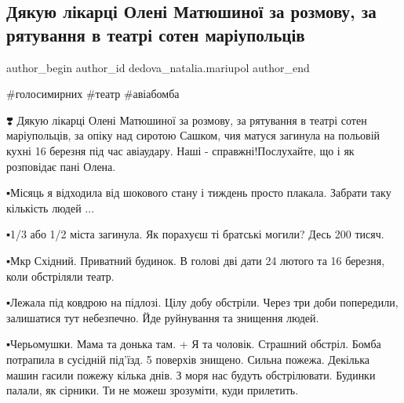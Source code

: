  
 
 
 
 

\subsection{Дякую лікарці Олені Матюшиної за розмову, за рятування в театрі сотен маріупольців}
\label{sec:09_01_2023.fb.dedova_natalia.mariupol.1.dyakuyu_l_karts__ole}

\ifcmt
 author_begin
   author_id dedova_natalia.mariupol
 author_end
\fi

\#голосимирних
\#театр
\#авіабомба

❣️ Дякую лікарці Олені Матюшиної за розмову, за рятування в театрі сотен
маріупольців, за опіку над сиротою Сашком, чия матуся загинула на польовій
кухні 16 березня під час авіаудару. Наші - справжні!Послухайте, що і як
розповідає пані Олена. 

▪️Місяць я відходила від шокового стану і тиждень просто плакала. Забрати таку
кількість людей ... 

▪️1/3 або 1/2 міста загинула. Як порахуєш ті братські могили? Десь 200 тисяч. 

▪️Мкр Східний. Приватний будинок. В голові дві дати 24 лютого та 16 березня,
коли обстріляли театр. 

▪️Лежала під ковдрою на підлозі. Цілу добу обстріли. Через три доби попередили,
залишатися тут небезпечно. Йде руйнування та знищення людей. 


▪️Черьомушки. Мама та донька там. + Я та чоловік. Страшний обстріл. Бомба
потрапила в сусідній під'їзд. 5 поверхів знищено. Сильна пожежа. Декілька машин
гасили пожежу кілька днів. З моря нас будуть обстрілювати. Будинки палали, як
сірники. Ти не можеш зрозуміти, куди прилетить. 

